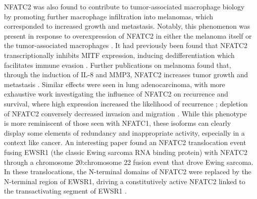 NFATC2 was also found to contribute to tumor\hyp{}associated macrophage biology by promoting further macrophage infiltration into melanomas, which corresponded to increased growth and metastasis. Notably, this phenomenon was present in response to overexpression of NFATC2 in either the melanoma itself or the tumor\hyp{}associated macrophages \citep{Liu2018}. It had previously been found that NFATC2 transcriptionally inhibits MITF expression, inducing dedifferentiation which facilitates immune evasion \citep{Perotti2016}. Further publications on melanoma found that, through the induction of IL\hyp{}8 and MMP3, NFATC2 increases tumor growth and metastasis \citep{Shoshan2016}. Similar effects were seen in lung adenocarcinoma, with more exhaustive work investigating the influence of NFATC2 on recurrence and survival, where high expression increased the likelihood of recurrence \citep{Xiao2017}; depletion of NFATC2 conversely decreased invasion and migration \citep{Liu2013}. While this phenotype is more reminiscent of those seen with NFATC1, these isoforms can clearly display some elements of redundancy and inappropriate activity, especially in a context like cancer. An interesting paper found an NFATC2 translocation event fusing EWSR1 (the classic Ewing sarcoma RNA binding protein) with NFATC2 through a chromosome 20:chromosome 22 fusion event that drove Ewing sarcoma. In these translocations, the N\hyp{}terminal domains of NFATC2 were replaced by the N\hyp{}terminal region of EWSR1, driving a constitutively active NFATC2 linked to the transactivating segment of EWSR1 \citep{Szuhai2009}. 

